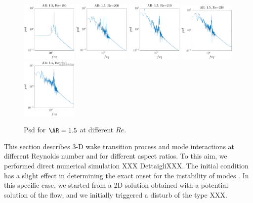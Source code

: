 \begin{figure}
  \centering
  \includegraphics[width=0.24\textwidth]{./fig/nnl/psdAR1.5RE190.png}
  \includegraphics[width=0.24\textwidth]{./fig/nnl/psdAR1.5RE200.png}  
  \includegraphics[width=0.24\textwidth]{./fig/nnl/psdAR1.5RE210.png}
  \includegraphics[width=0.24\textwidth]{./fig/nnl/psdAR1.5RE230.png}
  \includegraphics[width=0.24\textwidth]{./fig/nnl/psdAR1.5RE250.png}  
  \caption{Psd for $\AR=1.5$ at different $Re$.}
  \label{fig:ClCd}
\end{figure}

This section describes 3-D wake transition process and mode interactions at different Reynolds number and for different aspect ratios. To this aim, we performed direct numerical simulation XXX DettaigliXXX. The initial condition has a slight effect in determining the exact onset for the instability of modes \cite{jiang-cheng-an-2018}. In this specific case, we started from a 2D solution obtained with a potential solution of the flow, and we initially triggered a disturb of the type XXX. 

